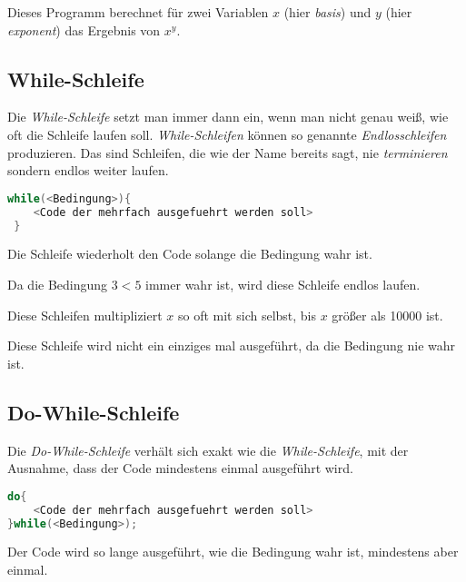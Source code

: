 \documentclass[c_worksheet.tex]{subfiles}
\begin{document}
Dieses Programm berechnet für zwei Variablen \(x\) (hier \emph{basis}) und \(y\) (hier \emph{exponent}) das Ergebnis von \(x^y\).


\subsection{While-Schleife}

Die \emph{While-Schleife} setzt man immer dann ein, wenn man nicht genau weiß, wie oft die Schleife laufen soll. \emph{While-Schleifen} können so genannte \emph{Endlosschleifen} produzieren. Das sind Schleifen, die wie der Name bereits sagt, nie \emph{terminieren} sondern endlos weiter laufen.

\begin{lstlisting}[language=c]
 while(<Bedingung>){
 	<Code der mehrfach ausgefuehrt werden soll>
 }
 \end{lstlisting}

 Die Schleife wiederholt den Code solange die Bedingung wahr ist.

  

 Da die Bedingung \( 3 < 5 \) immer wahr ist, wird diese Schleife endlos laufen.

  

 Diese Schleifen multipliziert \(x\) so oft mit sich selbst, bis \(x\) größer als 10000 ist.

 

Diese Schleife wird nicht ein einziges mal ausgeführt, da die Bedingung nie wahr ist.



\subsection{Do-While-Schleife}

Die \emph{Do-While-Schleife} verhält sich exakt wie die \emph{While-Schleife}, mit der Ausnahme, dass der Code mindestens einmal ausgeführt wird.

\begin{lstlisting}[language=c]
do{
 	<Code der mehrfach ausgefuehrt werden soll>
}while(<Bedingung>);
\end{lstlisting} 

Der Code wird so lange ausgeführt, wie die Bedingung wahr ist, mindestens aber einmal.
\end{document}
